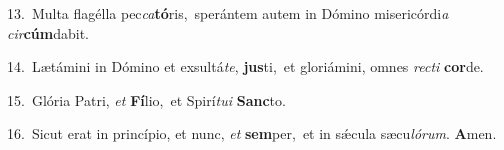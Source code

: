 {\numbfont\textcolor{\numbcolor}{13.}}~Multa flagélla pec\-\textit{ca}\-\textbf{tó}ris,~\star sperántem autem in Dómino misericórdi\textit{a} \textit{cir}\-\textbf{cúm}dabit.\par
{\numbfont\textcolor{\numbcolor}{14.}}~Lætámini in Dómino et exsultá\-\textit{te}\-, \textbf{jus}\-ti,~\star et gloriámini, omnes \textit{rec}\-\textit{ti} \textbf{cor}\-de.\par
{\numbfont\textcolor{\numbcolor}{15.}}~Glória Patri, \textit{et} \textbf{Fí}\-lio,~\star et Spirí\-\textit{tu}\-\textit{i} \textbf{Sanc}\-to.\par
{\numbfont\textcolor{\numbcolor}{16.}}~Sicut erat in princípio, et nunc, \textit{et} \textbf{sem}\-per,~\star et in sǽcula sæcu\-\textit{ló}\-\textit{rum}. \textbf{A}\-men.\par
